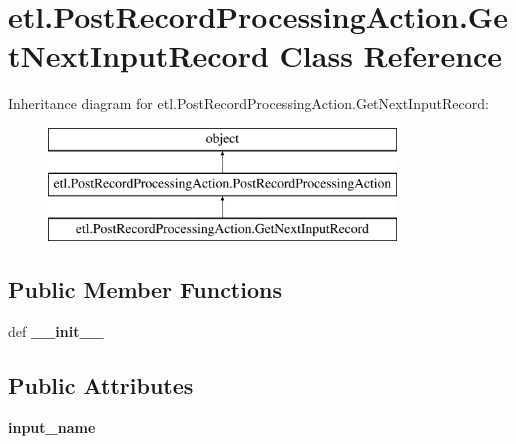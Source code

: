 \hypertarget{classetl_1_1PostRecordProcessingAction_1_1GetNextInputRecord}{\section{etl.\-Post\-Record\-Processing\-Action.\-Get\-Next\-Input\-Record Class Reference}
\label{classetl_1_1PostRecordProcessingAction_1_1GetNextInputRecord}
}
Inheritance diagram for etl.\-Post\-Record\-Processing\-Action.\-Get\-Next\-Input\-Record\-:\begin{figure}[H]
\begin{center}
\leavevmode
\includegraphics[height=3.000000cm]{classetl_1_1PostRecordProcessingAction_1_1GetNextInputRecord}
\end{center}
\end{figure}
\subsection*{Public Member Functions}
\begin{DoxyCompactItemize}
\item 
\hypertarget{classetl_1_1PostRecordProcessingAction_1_1GetNextInputRecord_a2de2ecd67e4bf4767686ce90ed80d3e5}{def {\bfseries \-\_\-\-\_\-init\-\_\-\-\_\-}}\label{classetl_1_1PostRecordProcessingAction_1_1GetNextInputRecord_a2de2ecd67e4bf4767686ce90ed80d3e5}

\end{DoxyCompactItemize}
\subsection*{Public Attributes}
\begin{DoxyCompactItemize}
\item 
\hypertarget{classetl_1_1PostRecordProcessingAction_1_1GetNextInputRecord_ab591c1210614fb122bbca0ccdf2e4815}{{\bfseries input\-\_\-name}}\label{classetl_1_1PostRecordProcessingAction_1_1GetNextInputRecord_ab591c1210614fb122bbca0ccdf2e4815}

\end{DoxyCompactItemize}


